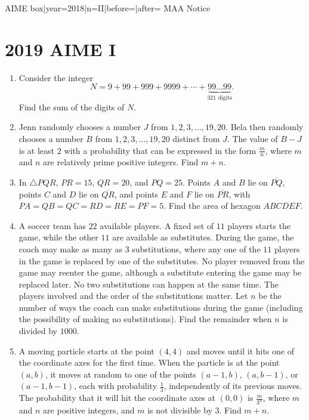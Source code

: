 \documentclass{article}
\begin{document}
\begin{enumerate}[label=\arabic*., itemsep=0.5em]
{{AIME box|year=2018|n=II|before=|after=}}
{{MAA Notice}}\par \vspace{0.5em}\end{enumerate}\newpage\section*{2019 AIME I}\begin{enumerate}[label=\arabic*., itemsep=0.5em]\item Consider the integer 
\begin{equation*}
N = 9 + 99 + 999 + 9999 + \cdots + \underbrace{99\ldots 99}_\text{321 digits}.
\end{equation*}
Find the sum of the digits of $N$.\par \vspace{0.5em}\item Jenn randomly chooses a number $J$ from $1, 2, 3,\ldots, 19, 20$. Bela then randomly chooses a number $B$ from $1, 2, 3,\ldots, 19, 20$ distinct from $J$. The value of $B - J$ is at least $2$ with a probability that can be expressed in the form $\tfrac{m}{n}$, where $m$ and $n$ are relatively prime positive integers. Find $m+n$.\par \vspace{0.5em}\item In $\triangle PQR$, $PR=15$, $QR=20$, and $PQ=25$. Points $A$ and $B$ lie on $\overline{PQ}$, points $C$ and $D$ lie on $\overline{QR}$, and points $E$ and $F$ lie on $\overline{PR}$, with $PA=QB=QC=RD=RE=PF=5$. Find the area of hexagon $ABCDEF$.\par \vspace{0.5em}\item A soccer team has $22$ available players. A fixed set of $11$ players starts the game, while the other $11$ are available as substitutes. During the game, the coach may make as many as $3$ substitutions, where any one of the $11$ players in the game is replaced by one of the substitutes. No player removed from the game may reenter the game, although a substitute entering the game may be replaced later. No two substitutions can happen at the same time. The players involved and the order of the substitutions matter. Let $n$ be the number of ways the coach can make substitutions during the game (including the possibility of making no substitutions). Find the remainder when $n$ is divided by $1000$.\par \vspace{0.5em}\item A moving particle starts at the point $(4,4)$ and moves until it hits one of the coordinate axes for the first time. When the particle is at the point $(a,b)$, it moves at random to one of the points $(a-1,b)$, $(a,b-1)$, or $(a-1,b-1)$, each with probability $\tfrac{1}{3}$, independently of its previous moves. The probability that it will hit the coordinate axes at $(0,0)$ is $\tfrac{m}{3^n}$, where $m$ and $n$ are positive integers, and $m$ is not divisible by $3$. Find $m + n$.\par 
\end{enumerate}
\end{document}
